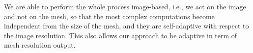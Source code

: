 We are able to perform the whole process image-based, i.e., we act on the image and not on the mesh, so that the most complex computations become independent from the size of the mesh, and they are self-adaptive with respect to the  image resolution. This also allows our approach to be adaptive in term of mesh resolution output.

% 


